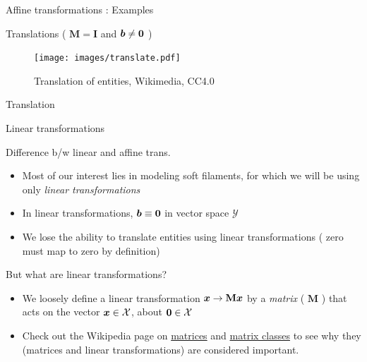 \documentclass[presentation]{beamer}
\newcommand{\gv}[1]{\ensuremath{\mbox{\boldmath$ #1 $}}}
\newcommand{\bv}[1]{\ensuremath{\mathbf{#1}}}
\begin{document}
\begin{frame}[label={sec:org13a6d10}]{Affine transformations : Examples}
\begin{block}{Translations ( \(\bv{M} = \bv{I}\) and \(\gv{b} \neq \gv{0}\) )}
\begin{figure}[htbp]
\centering
\texttt{[image: images/translate.pdf]}
\caption{Translation of entities, Wikimedia, CC4.0}
\end{figure}
\end{block}
\begin{block}{Translation}
\end{block}
\end{frame}
\begin{frame}[label={sec:org41e52d3}]{Linear transformations}
\begin{block}{Difference b/w linear and affine trans.}
\begin{itemize}
\item Most of our interest lies in modeling soft filaments, for which we will be
using only \emph{linear transformations}
\item In linear transformations, \(\gv{b} \equiv \gv{0}\) in vector space
\(\mathcal{Y}\)
\item We lose the ability to translate entities using linear transformations (
zero must map to zero by definition)
\end{itemize}
\end{block}
\end{frame}
\begin{frame}[label={sec:orgf3a20f5}]{But what are linear transformations?}
\begin{itemize}
\item We loosely define a linear transformation \(\gv{x} \to \bv{M}\gv{x}\) by a \emph{matrix}
( \(\bv{M}\) ) that acts on the vector \(\gv{x} \in \mathcal{X}\), about
\(\gv{0} \in \mathcal{X}\)
\item Check out the Wikipedia page on \href{https://en.wikipedia.org/wiki/Matrix\_(mathematics)}{matrices} and \href{https://en.wikipedia.org/wiki/Rotation\_matrix}{matrix classes} to see why they
(matrices and linear transformations) are considered important.
\end{itemize}
\end{frame}
\end{document}
